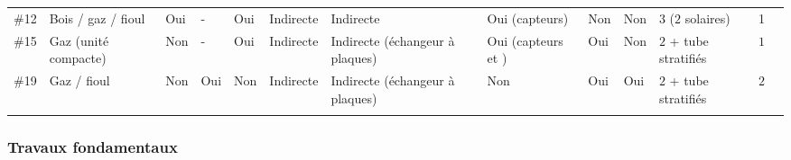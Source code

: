 \begin{landscape}
\begin{table}
\begin{tabular}{l C{2cm} C{1.5cm} C{0.6cm} C{1.4cm} C{1.7cm} C{1.7cm} C{1.2cm} C{1.5cm} C{1.2cm} C{2.5cm} C{1cm} r}
    \#12  & Bois / gaz / fioul  & Oui & - & Oui & Indirecte & Indirecte & Oui (capteurs)  & Non & Non & $3$ ($2$ solaires)  & 1 & \cite{Bales2002a} \\
    \addlinespace[1.5\defaultaddspace]
    \#15  & Gaz (unité compacte)  & Non & - & Oui & Indirecte & Indirecte (échangeur à plaques)  & Oui (capteurs et )  & Oui  & Non & $2$ + tube stratifiés & $1$ & \cite{Jaehnig2002}  \\
    \addlinespace[1.5\defaultaddspace]
    \#19  & Gaz / fioul & Non & Oui & Non & Indirecte & Indirecte (échangeur à plaques)  & Non & Oui & Oui & $2$ + tube stratifiés & $2$ & \cite{Heimrath2003} \\
    \addlinespace[1.5\defaultaddspace]
    \bottomrule
\end{tabular}
\end{table}
\end{landscape}


\subsubsection{Travaux fondamentaux} %
\label{ssub:travaux_fondamentaux}
